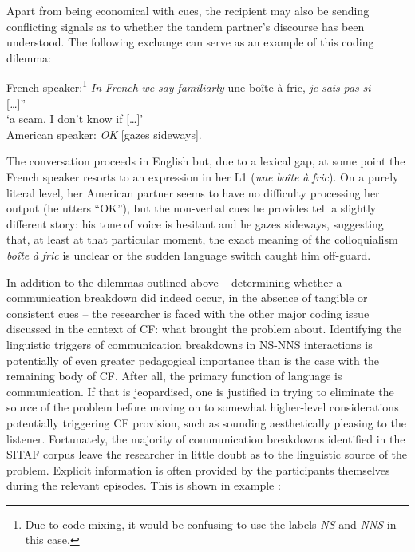 \documentclass[output=paper,colorlinks,citecolor=brown,modfonts,nonflat]{../langscibook}
\begin{document}
Apart from being economical with cues, the recipient may also be sending conflicting signals as to whether the tandem partner’s discourse has been understood. The following exchange can serve as an example of this coding dilemma: 

\ea\label{ex:scheuer:17}
French speaker:\footnote{{Due to code mixing, it would be confusing to use the labels} {\textit{NS} }{and} {\textit{NNS}} {in this case.}} \textit{In} \textit{French} \textit{we} \textit{say} \textit{familiarly} une boîte à fric, \textit{je} \textit{sais} \textit{pas} \textit{si}\\{}
[\textit{…}]”\\
‘a scam, I don’t know if […]’\\
American speaker: \textit{OK} [gazes sideways].
\z

The conversation proceeds in English but, due to a lexical gap, at some point the French speaker resorts to an expression in her L1 (\textit{une} \textit{boîte} \textit{à} \textit{fric}). On a purely literal level, her American partner seems to have no difficulty processing her output (he utters “OK”), but the non-verbal cues he provides tell a slightly different story: his tone of voice is hesitant and he gazes sideways, suggesting that, at least at that particular moment, the exact meaning of the colloquialism \textit{boîte} \textit{à} \textit{fric} is unclear or the sudden language switch caught him off-guard.

In addition to the dilemmas outlined above – determining whether a communication breakdown did indeed occur, in the absence of tangible or consistent cues – the researcher is faced with the other major coding issue discussed in the context of CF: what brought the problem about. Identifying the linguistic triggers of communication breakdowns in NS-NNS interactions is potentially of even greater pedagogical importance than is the case with the remaining body of CF. After all, the primary function of language is communication. If that is jeopardised, one is justified in trying to eliminate the source of the problem before moving on to somewhat higher-level considerations potentially triggering CF provision, such as sounding aesthetically pleasing to the listener. Fortunately, the majority of communication breakdowns identified in the SITAF corpus leave the researcher in little doubt as to the linguistic source of the problem. Explicit information is often provided by the participants themselves during the relevant episodes. This is shown in example :
\end{document}
